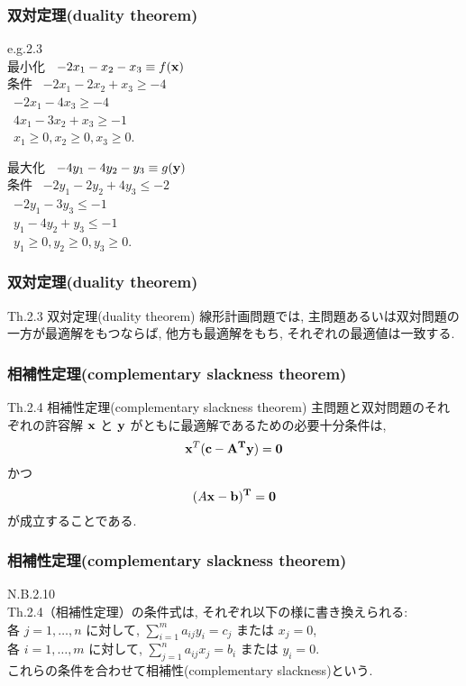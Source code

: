 \documentclass[unicode, 12pt, aspectratio = 169]{beamer}
\begin{document}
\begin{frame}[fragile]
	\frametitle{双対定理(duality theorem)}
		e.g.2.3 \\
		最小化 \ $-2x_1 - x_2 - x_3 \equiv f(\bf x)$ \\
		条件 \ $-2x_1 - 2x_2 + x_3 \ge -4$ \\
		\   $-2x_1 - 4x_3 \ge -4$ \\
		\   $4x_1 - 3x_2 + x_3 \ge -1$ \\
		\   $x_1 \ge 0, x_2 \ge 0, x_3 \ge 0.$
		
		最大化 \ $-4y_1 - 4y_2 - y_3 \equiv g(\bf y)$ \\
		条件 \ $-2y_1 - 2y_2 + 4y_3 \le -2$ \\
		\   $-2y_1 - 3y_3 \le -1$ \\
		\   $y_1 - 4y_2 + y_3 \le -1$ \\
		\   $y_1 \ge 0, y_2 \ge 0, y_3 \ge 0.$
\end{frame}

\begin{frame}[fragile]
	\frametitle{双対定理(duality theorem)}
		\begin{itembox}[l]{Th.2.3 双対定理(duality theorem)}
			線形計画問題では, 主問題あるいは双対問題の一方が最適解をもつならば, 
			他方も最適解をもち, それぞれの最適値は一致する.
		\end{itembox}
\end{frame}

\begin{frame}[fragile]
	\frametitle{相補性定理(complementary slackness theorem)}
	\begin{itembox}[l]{Th.2.4 相補性定理(complementary slackness theorem)}
		主問題と双対問題のそれぞれの許容解 $\bf x$ と $\bf y$ がともに最適解であるための必要十分条件は, 
		\[
			{\bf x}^T (\bf c - A^T \bf y) = 0
		\]
		かつ
		\[
			(A \bf x - \bf b)^T = 0
		\]
		が成立することである.
	\end{itembox}
\end{frame}

\begin{frame}[fragile]
	\frametitle{相補性定理(complementary slackness theorem)}
	N.B.2.10 \\
	Th.2.4（相補性定理）の条件式は, それぞれ以下の様に書き換えられる: \vspace{1em} \\
	各 $j = 1, \dots, n$ に対して, $\displaystyle \sum_{i=1}^m a_{ij} y_i = c_j$ または $x_j = 0$, \vspace{1em} \\
	各 $i = 1, \dots, m$ に対して, $\displaystyle \sum_{j=1}^n a_{ij} x_j = b_i$ または $y_i = 0$. \vspace{1em} \\
	これらの条件を合わせて相補性(complementary slackness)という.
\end{frame}
\end{document}
